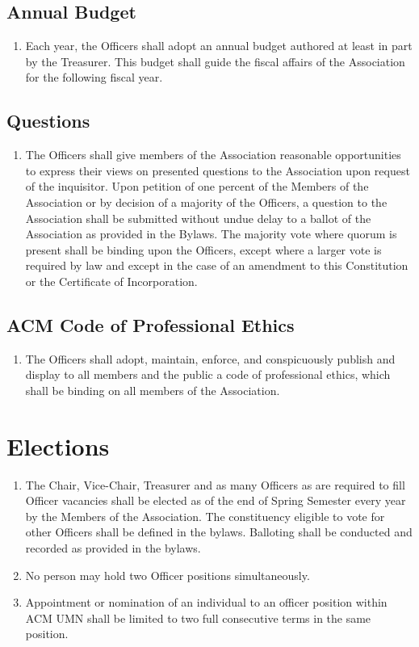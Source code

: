 \documentclass[12pt,letterpaper]{article}
\begin{document}
\subsection{Annual Budget}
\begin{enumerate}
	\item Each year, the Officers shall adopt an annual budget authored at least in
				part by the Treasurer. This budget shall guide the fiscal affairs of the
				Association for the following fiscal year.
\end{enumerate}

\subsection{Questions}
\begin{enumerate}
	\item The Officers shall give members of the Association reasonable opportunities
				to express their views on presented questions to the Association upon request
				of the inquisitor. Upon petition of one percent of the Members of the
				Association or by decision of a majority of the Officers, a question to the
				Association shall be submitted without undue delay to a ballot of the
				Association as provided in the Bylaws. The majority vote where quorum is
				present shall be binding upon the Officers, except where a larger vote is
				required by law and except in the case of an amendment to this Constitution
				or the Certificate of Incorporation.
\end{enumerate}

\subsection{ACM Code of Professional Ethics}
\begin{enumerate}
	\item The Officers shall adopt, maintain, enforce, and conspicuously publish and
				display to all members and the public a code of professional ethics, which
				shall be binding on all members of the Association.
\end{enumerate}

\section{Elections}
\begin{enumerate}
	\item The Chair, Vice-Chair, Treasurer and as many Officers as are required to fill
				Officer vacancies shall be elected as of the end of Spring Semester every
				year by the Members of the Association. The constituency eligible to vote for
				other Officers shall be defined in the bylaws. Balloting shall be conducted
				and recorded as provided in the bylaws.
	\item No person may hold two Officer positions simultaneously.
	\item Appointment or nomination of an individual to an officer position within ACM
				UMN shall be limited to two full consecutive terms in the same position.
\end{enumerate}
\end{document}
